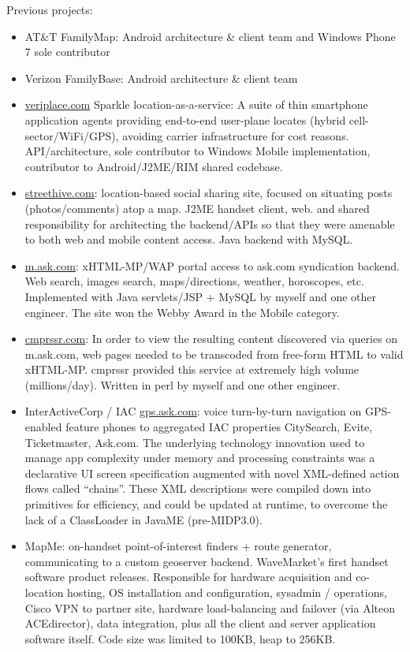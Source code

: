 Previous projects: 

	   \begin{itemize}
		\item AT\&T FamilyMap: Android architecture \& client team and Windows Phone 7 sole contributor  \\[-16pt]
		\item Verizon FamilyBase: Android architecture \& client team  \\[-16pt]

		\item \url{veriplace.com} Sparkle location-as-a-service: A suite of thin smartphone application agents providing end-to-end user-plane locates (hybrid cell-sector/WiFi/GPS), avoiding carrier infrastructure for cost reasons. API/architecture, sole contributor to Windows Mobile implementation, contributor to Android/J2ME/RIM shared codebase.

		\item \url{streethive.com}: location-based social sharing site, focused on situating posts (photos/comments) atop a map. J2ME handset client, web.  and shared responsibility for architecting the backend/APIs so that they were amenable to both web and mobile content access. Java backend with MySQL.

		\item \url{m.ask.com}: xHTML-MP/WAP portal access to ask.com syndication backend. Web search, images search, maps/directions, weather, horoscopes, etc. Implemented with Java servlets/JSP + MySQL by myself and one other engineer.  The site won the Webby Award in the Mobile category.

		\item \url{cmprssr.com}: In order to view the resulting content discovered via queries on m.ask.com, web pages needed to be transcoded from free-form HTML to valid xHTML-MP. cmprssr provided this service at extremely high volume (millions/day). Written in perl by myself and one other engineer.

  		\item InterActiveCorp / IAC \url{gps.ask.com}: voice turn-by-turn navigation on GPS-enabled feature phones to aggregated IAC properties CitySearch, Evite, Ticketmaster, Ask.com. The underlying technology innovation used to manage app complexity under memory and processing constraints was a declarative UI screen specification augmented with novel XML-defined action flows called “chains”. These XML descriptions were compiled down into primitives for efficiency, and could be updated at runtime, to overcome the lack of a ClassLoader in JavaME (pre-MIDP3.0). 
	   
  		\item MapMe: on-handset point-of-interest finders + route generator, communicating to a custom geoserver backend. WaveMarket’s first handset software product releases. Responsible for hardware acquisition and co-location hosting, OS installation and configuration, sysadmin / operations, Cisco VPN to partner site, hardware load-balancing and failover (via Alteon ACEdirector), data integration, plus all the client and server application software itself. Code size was limited to 100KB, heap to 256KB.
		
	\end{itemize}






